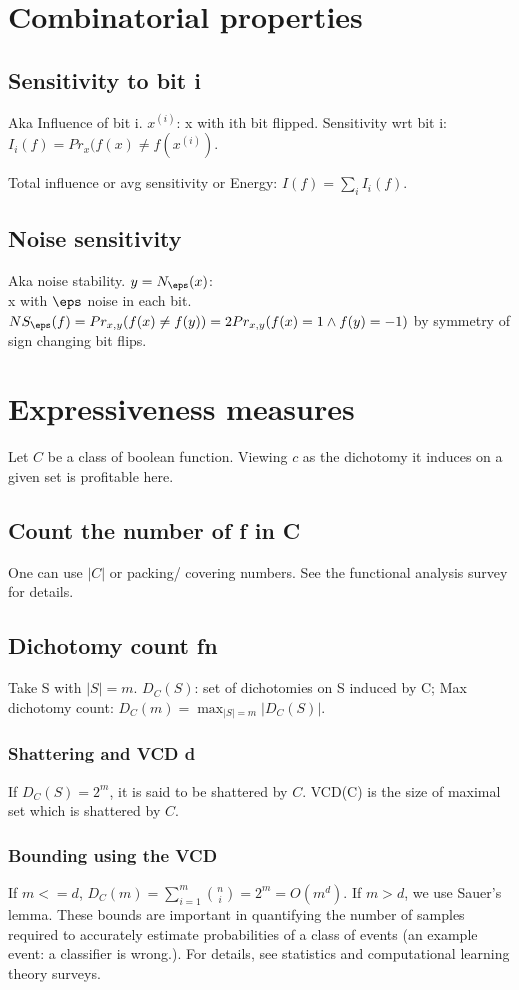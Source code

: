 \documentclass[oneside, article]{memoir}
\begin{document}
\section{Combinatorial properties}
\subsection{Sensitivity to bit i}
Aka Influence of bit i. $x^{(i)}$: x with ith bit flipped. Sensitivity wrt bit i: $I_{i}(f) = Pr_{x}(f(x) \neq f(x^{(i)})$.

Total influence or avg sensitivity or Energy: $I(f) = \sum_{i}I_{i}(f)$.

\subsection{Noise sensitivity}
Aka noise stability. $y = N_{\eps}(x)$: \\
x with $\eps$ noise in each bit. $NS_{\eps}(f) = Pr_{x,y}(f(x) \neq f(y)) = 2 Pr_{x,y}(f(x) = 1 \land f(y) = -1)$ by symmetry of sign changing bit flips.

\section{Expressiveness measures}
Let $C$ be a class of boolean function. Viewing $c$ as the dichotomy it induces on a given set is profitable here.

\subsection{Count the number of f in C}
One can use $|C|$ or packing/ covering numbers. See the functional analysis survey for details.

\subsection{Dichotomy count fn}
Take S with $|S| = m$. $D_{C}(S)$: set of dichotomies on S induced by C; Max dichotomy count: $D_{C}(m) = \max_{|S|=m}|D_{C}(S)|$.

\subsubsection{Shattering and VCD d}
If $D_{C}(S) = 2^{m}$, it is said to be shattered by $C$. VCD(C) is the size of maximal set which is shattered by $C$.

\subsubsection{Bounding using the VCD}
If $m<=d$, $D_{C}(m) = \sum_{i=1}^{m}\binom{n}{i} = 2^{m} = O(m^{d})$. If $m > d$, we use Sauer's lemma. These bounds are important in quantifying the number of samples required to accurately estimate probabilities of a class of events (an example event: a classifier is wrong.). For details, see statistics and computational learning theory surveys.
\end{document}
